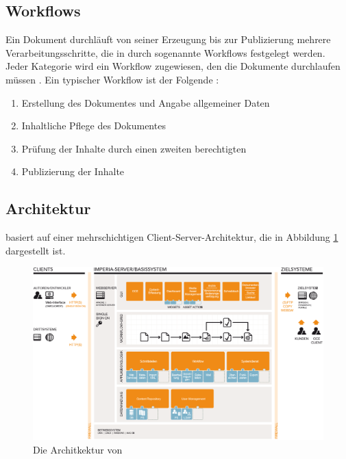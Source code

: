     \subsection{Workflows}
        Ein Dokument durchläuft von seiner Erzeugung bis zur
        Publizierung mehrere Verarbeitungsschritte,
        die in {\imperia} durch sogenannte Workflows festgelegt werden.
        Jeder Kategorie wird ein Workflow zugewiesen,
        den die Dokumente durchlaufen müssen
        \cite[Kapitel 1.1.5]{imperia:ecmd}.
        Ein typischer Workflow ist der Folgende
        \cite[Kapitel 1.1]{imperia:ecmd}:

        \begin{enumerate}
            \item Erstellung des Dokumentes und Angabe allgemeiner Daten
            \item Inhaltliche Pflege des Dokumentes
            \item Prüfung der Inhalte durch einen zweiten berechtigten \editor
            \item Publizierung der Inhalte
        \end{enumerate}

    \subsection{Architektur}
        \label{section:imperiaArch}
        {\imperia} basiert auf einer mehrschichtigen Client-Server-Architektur,
        die in Abbildung \ref{image:imperiaArchitektur} dargestellt ist.

        \begin{figure}[htb]
            \centering
            \includegraphics[width=\textwidth]{../resources/imperia/architektur.png}
            \caption{Die Architkektur von {\imperia} \cite{imperia:ecmd}}
            \label{image:imperiaArchitektur}
        \end{figure}

